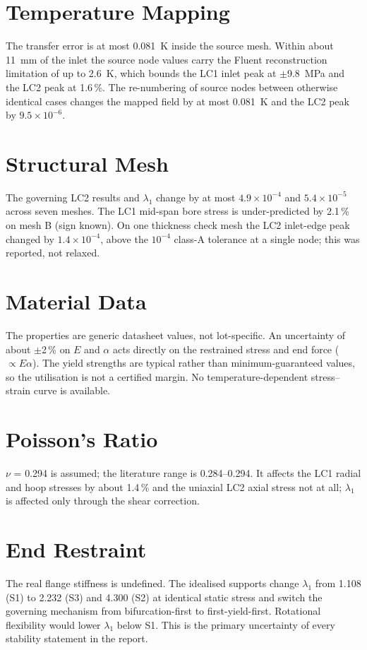 \section{Temperature Mapping}
The transfer error is at most 0.081~K inside the source mesh. Within about 11~mm of the inlet the source node values carry the Fluent
reconstruction limitation of up to 2.6~K, which bounds the LC1 inlet peak at $\pm$9.8~MPa and the LC2 peak at 1.6\,\%. The re-numbering of source
nodes between otherwise identical cases changes the mapped field by at most 0.081~K and the LC2 peak by $9.5\times10^{-6}$.

\section{Structural Mesh}
The governing LC2 results and $\lambda_1$ change by at most $4.9\times10^{-4}$ and $5.4\times10^{-5}$ across seven meshes. The LC1 mid-span bore
stress is under-predicted by 2.1\,\% on mesh B (sign known). On one thickness check mesh the LC2 inlet-edge peak changed by $1.4\times10^{-4}$,
above the $10^{-4}$ class-A tolerance at a single node; this was reported, not relaxed.

\section{Material Data}
The properties are generic datasheet values, not lot-specific. An uncertainty of about $\pm$2\,\% on $E$ and $\alpha$ acts directly on the
restrained stress and end force ($\propto E\alpha$). The yield strengths are typical rather than minimum-guaranteed values, so the utilisation
is not a certified margin. No temperature-dependent stress--strain curve is available.

\section{Poisson's Ratio}
$\nu$ = 0.294 is assumed; the literature range is 0.284--0.294. It affects the LC1 radial and hoop stresses by about 1.4\,\% and the uniaxial LC2
axial stress not at all; $\lambda_1$ is affected only through the shear correction.

\section{End Restraint}
The real flange stiffness is undefined. The idealised supports change $\lambda_1$ from 1.108 (S1) to 2.232 (S3) and 4.300 (S2) at identical
static stress and switch the governing mechanism from bifurcation-first to first-yield-first. Rotational flexibility would lower $\lambda_1$ below
S1. This is the primary uncertainty of every stability statement in the report.

